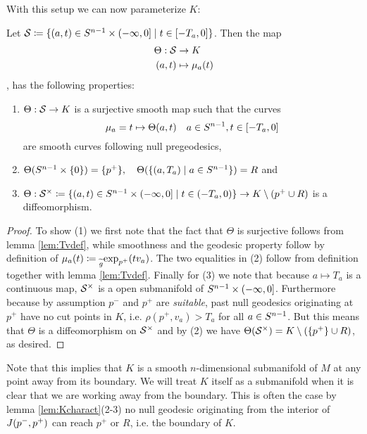 With this setup we can now parameterize $K$:
\begin{proposition}\label{prop:thetaconstr}
    Let ${\mathcal{S}}\coloneqq \{(a,t)\in {S^{n-1}} \times (-\infty,0]\mid t \in [-T_a,0]\}$.
    Then the map
    \begin{align*}
        \Theta:{\mathcal{S}}&\to K\\
        (a,t)&\mapsto \mu_a(t)
    \end{align*}, has the following properties:
    \begin{enumerate}[label=\textnormal{(\arabic*)}]
        \item $\Theta:{\mathcal{S}}\to K$ is a surjective smooth map such that the curves 
        \[\mu_a=t\mapsto\Theta(a,t) \quad a\in {S^{n-1}}, t\in [-T_a,0]\] are smooth curves following null pregeodesics,
        \item $\Theta(S^{n-1}\times\{0\}) = \{p^+\}, \quad \Theta(\{(a,T_a)\mid a\in {S^{n-1}}\}) = R$ and
        \item $\Theta:{\mathcal{S}}^\times\coloneqq \{(a,t)\in {S^{n-1}} \times (-\infty,0]\mid t \in (-T_a,0)\}\to K\setminus ({p^+} \cup R)$ is a diffeomorphism.
    \end{enumerate}
\end{proposition}
\begin{proof}
    To show (1) we first note that the fact that $\Theta$ is surjective follows from lemma \ref{lem:Tvdef}, while smoothness and the geodesic property follow by definition of $\mu_a(t)\coloneqq \prescript{}{\widetilde{g}}{\exp_{p^+}(tv_a)}$.
    The two equalities in (2) follow from definition together with lemma \ref{lem:Tvdef}.
    Finally for (3) we note that because $a\mapsto T_a$ is a continuous map, ${\mathcal{S}}^\times$ is a open submanifold of ${S^{n-1}}\times (-\infty,0]$. Furthermore because by assumption $p^-$ and $p^+$ are \emph{suitable}, past null geodesics originating at $p^+$ have no cut points in $K$, i.e. $\rho(p^+,v_a)>T_a$ for all $a\in {S^{n-1}}$. But this means that $\Theta$ is a diffeomorphism on ${\mathcal{S}}^\times$ and by (2) we have $\Theta({\mathcal{S}}^\times)=K\setminus (\{p^+\}\cup R)$, as desired.
\end{proof}


Note that this implies that $K$ is a smooth $n$-dimensional submanifold of $M$ at any point away from its boundary. We will treat $K$ itself as a submanifold when it is clear that we are working away from the boundary. This is often the case by lemma \ref{lem:Kcharact}(2-3) no null geodesic originating from the interior of $J(p^-,p^+)$ can reach $p^+$ or $R$, i.e. the boundary of $K$.

